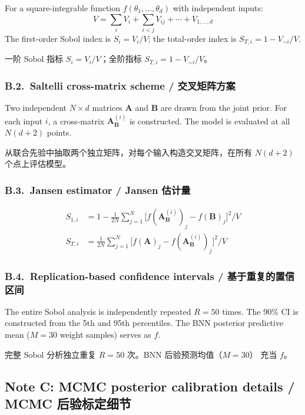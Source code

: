 \documentclass[11pt,a4paper]{article}
\begin{document}
For a square-integrable function $f(\theta_1, \ldots, \theta_d)$ with
independent inputs:
\begin{equation}
V = \sum_i V_i + \sum_{i<j} V_{ij} + \cdots + V_{1,\ldots,d}
\end{equation}
The first-order Sobol index is $S_i = V_i / V$; the total-order index
is $S_{T,i} = 1 - V_{\sim i} / V$.

一阶 Sobol 指标 $S_i = V_i / V$；全阶指标 $S_{T,i} = 1 - V_{\sim i} / V$。

\subsubsection*{B.2.~Saltelli cross-matrix scheme / 交叉矩阵方案}

Two independent $N \times d$ matrices $\mathbf{A}$ and $\mathbf{B}$ are
drawn from the joint prior. For each input $i$, a cross-matrix
$\mathbf{A}_\mathbf{B}^{(i)}$ is constructed. The model is evaluated at
all $N(d+2)$ points.

从联合先验中抽取两个独立矩阵，对每个输入构造交叉矩阵，在所有
$N(d+2)$ 个点上评估模型。

\subsubsection*{B.3.~Jansen estimator / Jansen 估计量}

\begin{align}
S_{1,i} &= 1 - \frac{1}{2N}\sum_{j=1}^{N}
  \bigl[f(\mathbf{A}_\mathbf{B}^{(i)})_j - f(\mathbf{B})_j\bigr]^2 / V \\
S_{T,i} &= \frac{1}{2N}\sum_{j=1}^{N}
  \bigl[f(\mathbf{A})_j - f(\mathbf{A}_\mathbf{B}^{(i)})_j\bigr]^2 / V
\end{align}

\subsubsection*{B.4.~Replication-based confidence intervals / 基于重复的置信区间}

The entire Sobol analysis is independently repeated $R = 50$ times. The
90\% CI is constructed from the 5th and 95th percentiles. The BNN
posterior predictive mean ($M = 30$ weight samples) serves as $f$.

完整 Sobol 分析独立重复 $R = 50$ 次。BNN 后验预测均值（$M = 30$）
充当 $f$。


\subsection{Note C: MCMC posterior calibration details / MCMC 后验标定细节}
\end{document}
